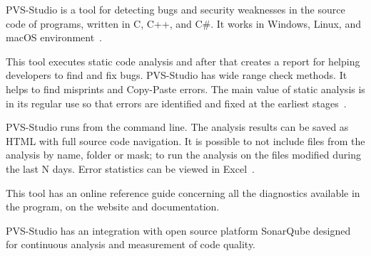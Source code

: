 PVS-Studio is a tool for detecting bugs and security weaknesses in the source code of programs, written in C, C++, and C\#. It works in Windows, Linux, and macOS environment~\cite{pvs}.

This tool executes static code analysis and after that creates a report for helping developers to find and fix bugs. PVS-Studio has wide range check methods. It helps to find misprints and Copy-Paste errors. The main value of static analysis is in its regular use so that errors are identified and fixed at the earliest stages~\cite{pvs}. 

PVS-Studio runs from the command line. The analysis results can be saved as HTML with full source code navigation. It is possible to not include files from the analysis by name, folder or mask; to run the analysis on the files modified during the last N days. Error statistics can be viewed in Excel~\cite{pvs}. 

This tool has an online reference guide concerning all the diagnostics available in the program, on the website and documentation. 

PVS-Studio has an integration with open source platform SonarQube designed for continuous analysis and measurement of code quality.